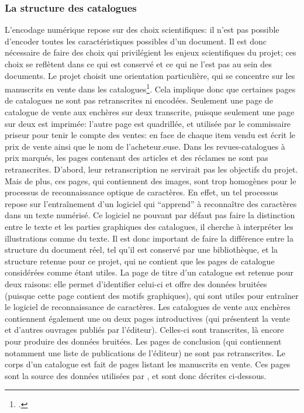 \subsubsection{La structure des catalogues}
L'encodage numérique repose sur des choix scientifiques: il n'est pas possible d'encoder toutes les caractéristiques possibles d'un document. Il est donc nécessaire de faire des choix qui privilégient les enjeux scientifiques du projet; ces choix se reflètent dans ce qui est conservé et ce qui ne l'est pas au sein  des documents. Le projet \mssktb{} choisit une orientation particulière, qui se concentre sur les manuscrits en vente dans les catalogues\footcite[p. 27]{rondeau_du_noyer_encoder_2019}. Cela implique donc que certaines pages de catalogues ne sont pas retranscrites ni encodées. Seulement une page de catalogue de vente aux enchères sur deux transcrite, puisque seulement une page sur deux est imprimée: l'autre page est quadrillée, et utilisée par le commissaire priseur pour tenir le compte des ventes: en face de chaque item vendu est écrit le prix de vente ainsi que le nom de l'acheteur.euse. Dans les revues-catalogues à prix marqués, les pages contenant des articles et des réclames ne sont pas retranscrites. D'abord, leur retranscription ne servirait pas les objectifs du projet. Mais de plus, ces pages, qui contiennent des images, sont trop homogènes pour le processus de reconnaissance optique de caractères. En effet, un tel processus repose sur l'entraînement d'un logiciel qui \enquote{apprend} à reconnaître des caractères dans un texte numérisé. Ce logiciel ne pouvant par défaut pas faire la distinction entre le texte et les parties graphiques des catalogues, il cherche à interpréter les illustrations comme du texte. Il est donc important de faire la différence entre la structure du document réel, tel qu'il est conservé par une bibliothèque, et la structure retenue pour ce projet, qui ne contient que les pages de catalogue considérées comme étant utiles. La page de titre d'un catalogue est retenue pour deux raisons: elle permet d'identifier celui-ci et offre des données bruitées (puisque cette page contient des motifs graphiques), qui sont utiles pour entraîner le logiciel de reconnaissance de caractères. Les catalogues de vente aux enchères contiennent également une ou deux pages introductives (qui présentent la vente et d'autres ouvrages publiés par l'éditeur). Celles-ci sont transcrites, là encore pour produire des données bruitées. Les pages de conclusion (qui contiennent notamment une liste de publications de l'éditeur) ne sont pas retranscrites. Le corps d'un catalogue est fait de pages listant les manuscrits en vente. Ces pages sont la source des données utilisées par \mssktb{}, et sont donc décrites ci-dessous.

